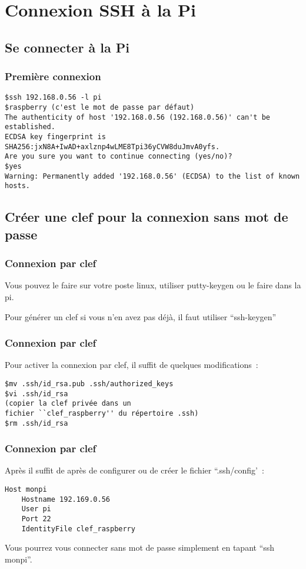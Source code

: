\section{Connexion SSH à la Pi}

\subsection{Se connecter à la Pi}

\begin{frame}[containsverbatim]
\frametitle{Première connexion}

\begin{verbatim}
$ssh 192.168.0.56 -l pi
$raspberry (c'est le mot de passe par défaut)
The authenticity of host '192.168.0.56 (192.168.0.56)' can't be established.
ECDSA key fingerprint is SHA256:jxN8A+IwAD+axlznp4wLME8Tpi36yCVW8duJmvA0yfs.
Are you sure you want to continue connecting (yes/no)? 
$yes
Warning: Permanently added '192.168.0.56' (ECDSA) to the list of known hosts.
\end{verbatim}
\end{frame}

\subsection{Créer une clef pour la connexion sans mot de passe}

\begin{frame}[containsverbatim]
\frametitle{Connexion par clef}

Vous pouvez le faire sur votre poste linux, utiliser putty-keygen ou le faire dans la pi.

Pour générer un clef si vous n'en avez pas déjà, il faut utiliser ``ssh-keygen''
\end{frame}

\begin{frame}[containsverbatim]
\frametitle{Connexion par clef}

Pour activer la connexion par clef, il suffit de quelques modifications~:
\begin{verbatim}
$mv .ssh/id_rsa.pub .ssh/authorized_keys
$vi .ssh/id_rsa
(copier la clef privée dans un 
fichier ``clef_raspberry'' du répertoire .ssh)
$rm .ssh/id_rsa
\end{verbatim}
\end{frame}

\begin{frame}[containsverbatim]
\frametitle{Connexion par clef}

Après il suffit de après de configurer ou de créer le fichier ``.ssh/config'~:

\begin{verbatim}
Host monpi
    Hostname 192.169.0.56
    User pi
    Port 22
    IdentityFile clef_raspberry
\end{verbatim}

Vous pourrez vous connecter sans mot de passe simplement en tapant ``ssh monpi''.

\end{frame}


